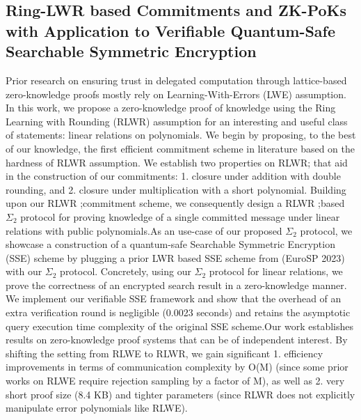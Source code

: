 \documentclass[11pt]{article}
\theoremstyle{definition}
\theoremstyle{remark}
\theoremstyle{plain}
\begin{document}
\subsection{\cite{10.1145/3708821.3736223} Ring-LWR based Commitments and ZK-PoKs with Application to Verifiable Quantum-Safe Searchable Symmetric Encryption}

Prior research on ensuring trust in delegated computation through lattice-based zero-knowledge proofs mostly rely on Learning-With-Errors (LWE) assumption. In this work, we propose a zero-knowledge proof of knowledge using the Ring Learning with Rounding (RLWR) assumption for an interesting and useful class of statements: linear relations on polynomials. We begin by proposing, to the best of our knowledge, the first efficient commitment scheme in literature based on the hardness of RLWR  assumption. We establish two properties on RLWR; that aid in the construction of our commitments: 1. closure under addition with double rounding, and 2. closure under multiplication with a short polynomial. Building upon our RLWR ;commitment scheme, we consequently design a RLWR ;based  $\Sigma_2$ protocol for proving knowledge of a single committed message under linear relations with public polynomials.As an use-case of our proposed  $\Sigma_2$ protocol, we showcase a construction of a quantum-safe Searchable Symmetric Encryption (SSE) scheme by plugging a prior LWR based SSE scheme from (EuroSP 2023) with our  $\Sigma_2$ protocol. Concretely, using our  $\Sigma_2$ protocol for linear relations, we prove the correctness of an encrypted search result in a zero-knowledge manner. We implement our verifiable SSE framework and show that the overhead of an extra verification round is negligible (0.0023 seconds) and retains the asymptotic query execution time complexity of the original SSE scheme.Our work establishes results on zero-knowledge proof systems that can be of independent interest. By shifting the setting from RLWE to RLWR, we gain significant 1. efficiency improvements in terms of communication complexity by O(M) (since some prior works on RLWE require rejection sampling by a factor of M), as well as 2. very short proof size (8.4 KB) and tighter parameters (since RLWR does not explicitly manipulate error polynomials like RLWE).
\end{document}
